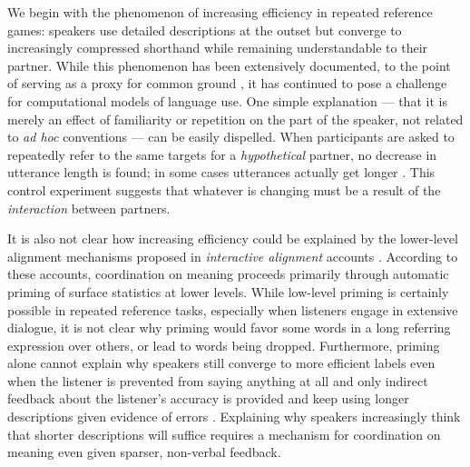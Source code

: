 

We begin with the phenomenon of increasing efficiency in repeated reference games: speakers use detailed descriptions at the outset but converge to increasingly compressed shorthand while remaining understandable to their partner.
While this phenomenon has been extensively documented, to the point of serving as a proxy for common ground \cite{}, it has continued to pose a challenge for computational models of language use.
One simple explanation --- that it is merely an effect of familiarity or repetition on the part of the speaker, not related to \emph{ad hoc} conventions --- can be easily dispelled. 
When participants are asked to repeatedly refer to the same targets for a \emph{hypothetical} partner, no decrease in utterance length is found; in some cases utterances actually get longer \cite{HupetChantraine92_CollaborationOrRepitition}. 
This control experiment suggests that whatever is changing must be a result of the \emph{interaction} between partners.

It is also not clear how increasing efficiency could be explained by the lower-level alignment mechanisms proposed in \emph{interactive alignment} accounts \cite{pickering2004toward, pickering2006alignment, garrod2009joint}.
According to these accounts, coordination on meaning proceeds primarily through automatic priming of surface statistics at lower levels.
While low-level priming is certainly possible in repeated reference tasks, especially when listeners engage in extensive dialogue, it is not clear why priming would favor some words in a long referring expression over others, or lead to words being dropped.
Furthermore, priming alone cannot explain why speakers still converge to more efficient labels even when the listener is prevented from saying anything at all and only indirect feedback about the listener's accuracy is provided \cite{KraussWeinheimer66_Tangrams} and keep using longer descriptions given evidence of errors \cite{hawkins2020characterizing}.
Explaining why speakers increasingly think that shorter descriptions will suffice requires a mechanism for coordination on meaning even given sparser, non-verbal feedback.

